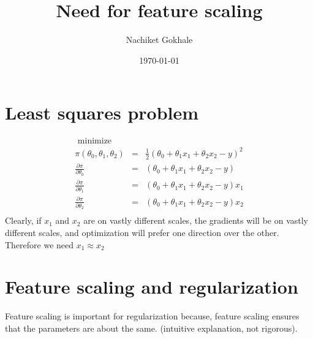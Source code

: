 \documentclass{article}
\newcommand{\ber}{\begin{eqnarray}}
\newcommand{\eer}{\end{eqnarray}}
\newcommand{\nn}{\nonumber}
\begin{document}
\title{Need for feature scaling}
\author{Nachiket Gokhale}
\date{\today}
\maketitle
\section{Least squares problem}
\ber
\text{ minimize }\nn\\
\pi(\theta_0,\theta_1,\theta_2) &=& \frac{1}{2}(\theta_0 + \theta_1x_1 + \theta_2x_2 - y)^2\\
\frac{\partial\pi}{\partial\theta_0} &=& (\theta_0 + \theta_1x_1 + \theta_2x_2 - y) \nn \\
\frac{\partial\pi}{\partial\theta_1} &=& (\theta_0 + \theta_1x_1 + \theta_2x_2 - y)x_1 \nn \\
\frac{\partial\pi}{\partial\theta_2} &=& (\theta_0 + \theta_1x_1 + \theta_2x_2 - y)x_2 \nn \\
\eer
Clearly, if $x_1$ and $x_2$ are on vastly different scales, the gradients will be on vastly different scales, and optimization will prefer one direction over the other. Therefore we need $x_1\approx x_2$
%
\section{Feature scaling and regularization}
Feature scaling is important for regularization because, feature scaling ensures that the parameters are about the same. (intuitive explanation, not rigorous).
\end{document}
